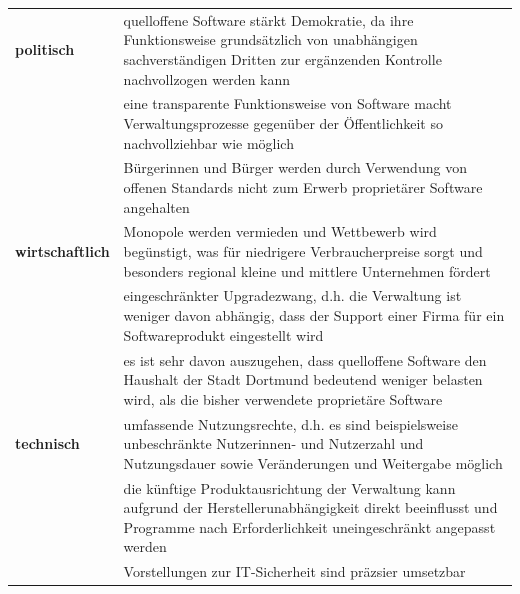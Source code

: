 \documentclass[a4paper]{article}
\begin{document}
\begin{center}
\tablehead{}
\begin{supertabular}{|m{0.9844598in}m{4.76776in}|}
\hline
{}\bfseries politisch &
 quelloffene Software st\"arkt Demokratie, da
ihre Funktionsweise grunds\"atzlich von unabh\"angigen
sachverst\"andigen Dritten zur erg\"anzenden Kontrolle nachvollzogen
werden kann\\\hhline{~-}
~
 &
 eine transparente Funktionsweise von Software
macht Verwaltungsprozesse gegen\"uber der \"Offentlichkeit so
nachvollziehbar wie m\"oglich\\\hhline{~-}
~
 &
 B\"urgerinnen und B\"urger werden durch
Verwendung von offenen Standards nicht zum Erwerb propriet\"arer
Software angehalten\\\hline
{}\bfseries wirtschaftlich &
 Monopole werden vermieden und Wettbewerb wird
beg\"unstigt, was f\"ur niedrigere Verbraucherpreise sorgt und
besonders regional kleine und mittlere Unternehmen
f\"ordert\\\hhline{~-}
~
 &
 eingeschr\"ankter Upgradezwang, d.h. die
Verwaltung ist weniger davon abh\"angig, dass der Support einer Firma
f\"ur ein Softwareprodukt eingestellt wird\\\hhline{~-}
~
 &
 es ist sehr davon auszugehen, dass quelloffene
Software den Haushalt der Stadt Dortmund bedeutend weniger belasten
wird, als die bisher verwendete propriet\"are Software\\\hline
{}\bfseries technisch &
 umfassende Nutzungsrechte, d.h. es sind
beispielsweise unbeschr\"ankte Nutzerinnen- und Nutzerzahl und
Nutzungsdauer sowie Ver\"anderungen und Weitergabe
m\"oglich\\\hhline{~-}
~
 &
 die k\"unftige Produktausrichtung der
Verwaltung kann aufgrund der Herstellerunabh\"angigkeit direkt
beeinflusst und Programme nach Erforderlichkeit uneingeschr\"ankt
angepasst werden\\\hhline{~-}
~
 &
 Vorstellungen zur IT-Sicherheit sind pr\"azsier
umsetzbar\\\hline
\end{supertabular}
\end{center}

\bigskip
\end{document}
